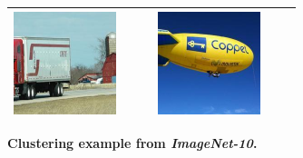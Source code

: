 \begin{figure}[h]
\begin{tabular}{|p{0.4\linewidth}p{0.4\linewidth}|}
\includegraphics[width=\linewidth,frame]{figures/examples_assests/clustering/2_3.pdf} & 
\includegraphics[width=\linewidth,frame]{figures/examples_assests/clustering/6_1.pdf} \\
\hline
\end{tabular}
\caption{\textbf{Clustering example from \emph{ImageNet-10}.}}
\label{fig:linclusteringear_example}
\end{figure}
